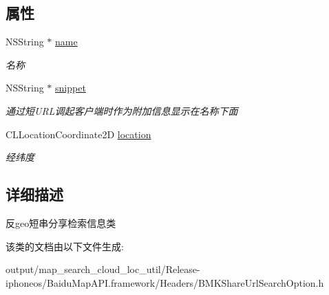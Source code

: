 \subsection*{属性}
\begin{DoxyCompactItemize}
\item 
\hypertarget{interface_b_m_k_location_share_u_r_l_option_a11f562286c830a4e78f9c7f1d40aded4}{}N\+S\+String $\ast$ \hyperlink{interface_b_m_k_location_share_u_r_l_option_a11f562286c830a4e78f9c7f1d40aded4}{name}\label{interface_b_m_k_location_share_u_r_l_option_a11f562286c830a4e78f9c7f1d40aded4}

\begin{DoxyCompactList}\small\item\em 名称 \end{DoxyCompactList}\item 
\hypertarget{interface_b_m_k_location_share_u_r_l_option_a9eb77e28dac4084933eb17cd3adef344}{}N\+S\+String $\ast$ \hyperlink{interface_b_m_k_location_share_u_r_l_option_a9eb77e28dac4084933eb17cd3adef344}{snippet}\label{interface_b_m_k_location_share_u_r_l_option_a9eb77e28dac4084933eb17cd3adef344}

\begin{DoxyCompactList}\small\item\em 通过短\+U\+R\+L调起客户端时作为附加信息显示在名称下面 \end{DoxyCompactList}\item 
\hypertarget{interface_b_m_k_location_share_u_r_l_option_adecb9b65fe164ed23f271b0693bfa354}{}C\+L\+Location\+Coordinate2\+D \hyperlink{interface_b_m_k_location_share_u_r_l_option_adecb9b65fe164ed23f271b0693bfa354}{location}\label{interface_b_m_k_location_share_u_r_l_option_adecb9b65fe164ed23f271b0693bfa354}

\begin{DoxyCompactList}\small\item\em 经纬度 \end{DoxyCompactList}\end{DoxyCompactItemize}


\subsection{详细描述}
反geo短串分享检索信息类 

该类的文档由以下文件生成\+:\begin{DoxyCompactItemize}
\item 
output/map\+\_\+search\+\_\+cloud\+\_\+loc\+\_\+util/\+Release-\/iphoneos/\+Baidu\+Map\+A\+P\+I.\+framework/\+Headers/B\+M\+K\+Share\+Url\+Search\+Option.\+h\end{DoxyCompactItemize}
